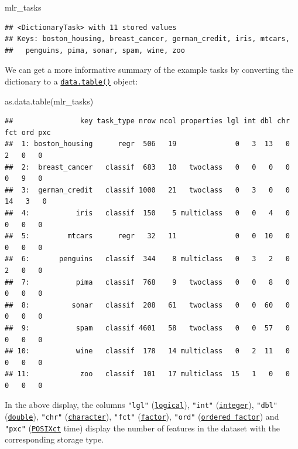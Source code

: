 \documentclass[
]{scrbook}
\newenvironment{Shaded}{\begin{snugshade}}{\end{snugshade}}
\newcommand{\FunctionTok}[1]{\textcolor[rgb]{0.00,0.00,0.00}{#1}}
\newcommand{\NormalTok}[1]{#1}
\renewenvironment{Shaded} {\begin{snugshade}\small} {\end{snugshade}}
\begin{document}
\begin{Shaded}
\begin{Highlighting}[]
\NormalTok{mlr\_tasks}
\end{Highlighting}
\end{Shaded}

\begin{verbatim}
## <DictionaryTask> with 11 stored values
## Keys: boston_housing, breast_cancer, german_credit, iris, mtcars,
##   penguins, pima, sonar, spam, wine, zoo
\end{verbatim}

We can get a more informative summary of the example tasks by converting the dictionary to a \href{https://www.rdocumentation.org/packages/data.table/topics/data.table-package}{\texttt{data.table()}} object:

\begin{Shaded}
\begin{Highlighting}[]
\FunctionTok{as.data.table}\NormalTok{(mlr\_tasks)}
\end{Highlighting}
\end{Shaded}

\begin{verbatim}
##                key task_type nrow ncol properties lgl int dbl chr fct ord pxc
##  1: boston_housing      regr  506   19              0   3  13   0   2   0   0
##  2:  breast_cancer   classif  683   10   twoclass   0   0   0   0   0   9   0
##  3:  german_credit   classif 1000   21   twoclass   0   3   0   0  14   3   0
##  4:           iris   classif  150    5 multiclass   0   0   4   0   0   0   0
##  5:         mtcars      regr   32   11              0   0  10   0   0   0   0
##  6:       penguins   classif  344    8 multiclass   0   3   2   0   2   0   0
##  7:           pima   classif  768    9   twoclass   0   0   8   0   0   0   0
##  8:          sonar   classif  208   61   twoclass   0   0  60   0   0   0   0
##  9:           spam   classif 4601   58   twoclass   0   0  57   0   0   0   0
## 10:           wine   classif  178   14 multiclass   0   2  11   0   0   0   0
## 11:            zoo   classif  101   17 multiclass  15   1   0   0   0   0   0
\end{verbatim}

In the above display, the columns \texttt{"lgl"} (\href{https://www.rdocumentation.org/packages/base/topics/logical}{\texttt{logical}}), \texttt{"int"} (\href{https://www.rdocumentation.org/packages/base/topics/integer}{\texttt{integer}}), \texttt{"dbl"} (\href{https://www.rdocumentation.org/packages/base/topics/double}{\texttt{double}}), \texttt{"chr"} (\href{https://www.rdocumentation.org/packages/base/topics/character}{\texttt{character}}), \texttt{"fct"} (\href{https://www.rdocumentation.org/packages/base/topics/factor}{\texttt{factor}}), \texttt{"ord"} (\href{https://www.rdocumentation.org/packages/base/topics/factor}{\texttt{ordered\ factor}}) and \texttt{"pxc"} (\href{https://www.rdocumentation.org/packages/base/topics/DateTimeClasses}{\texttt{POSIXct}} time) display the number of features in the dataset with the corresponding storage type.
\end{document}
